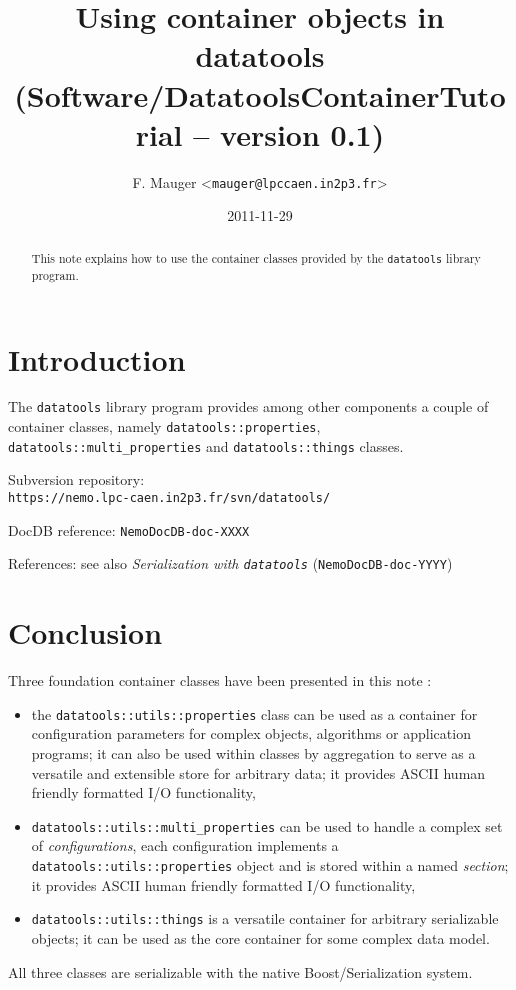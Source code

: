 \documentclass[a4paper,12pt]{article}
\title{Using container objects in datatools\\%
{\small{(Software/DatatoolsContainerTutorial -- version 0.1)}}}
\author{F. Mauger <\texttt{mauger@lpccaen.in2p3.fr}>}
\date{2011-11-29}
\newcommand{\pn}{\par\noindent}
\begin{document}
\maketitle

\begin{abstract}
This note  explains how to use  the container classes  provided by the
\texttt{datatools} library program.
\end{abstract}

\tableofcontents

\section{Introduction}

\pn  The  \texttt{datatools}  library  program  provides  among  other
components     a    couple     of     container    classes,     namely
\texttt{datatools::properties},   \texttt{datatools::multi\_properties}
and \texttt{datatools::things} classes.

\vskip 5mm
\pn
Subversion repository:\\
\texttt{https://nemo.lpc-caen.in2p3.fr/svn/datatools/}
\pn
DocDB reference: \texttt{NemoDocDB-doc-XXXX}
\pn
References: see also \textit{Serialization with \texttt{datatools}} 
(\texttt{NemoDocDB-doc-YYYY})

\clearpage


\clearpage


\clearpage


\clearpage

\section{Conclusion}

\pn  Three foundation container  classes have  been presented  in this
note :

\begin{itemize}

\item the \texttt{datatools::utils::properties} class can be used as a
  container   for  configuration   parameters  for   complex  objects,
  algorithms  or  application programs;  it  can  also  be used  within
  classes by aggregation to serve  as a versatile and extensible store
  for arbitrary  data; it provides ASCII human  friendly formatted I/O
  functionality,
  
\item  \texttt{datatools::utils::multi\_properties}  can  be  used  to
  handle  a complex set  of \emph{configurations},  each configuration
  implements  a  \texttt{datatools::utils::properties}  object and  is
  stored  within  a  named  \emph{section}; it  provides  ASCII  human
  friendly formatted I/O functionality,

\item \texttt{datatools::utils::things}  is a versatile  container for
  arbitrary serializable objects; it can be used as the core container
  for some complex data model.

\end{itemize}

All three classes are serializable with the native Boost/Serialization
system.
\end{document}
